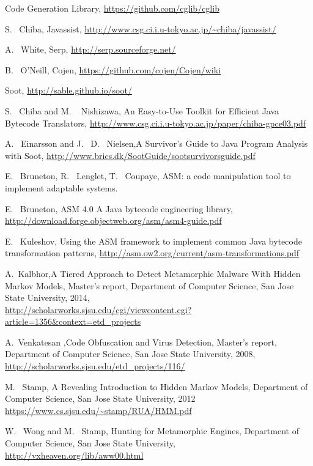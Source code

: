 \begin{thebibliography}{10}
 Code Generation Library,
\url{https://github.com/cglib/cglib}

 S. ~Chiba, Javassist,
\url{http://www.csg.ci.i.u-tokyo.ac.jp/~chiba/javassist/}

 A. ~White, Serp,
\url{http://serp.sourceforge.net/}

 B. ~O'Neill, Cojen,
\url{https://github.com/cojen/Cojen/wiki}

 Soot,
\url{http://sable.github.io/soot/}

 S. ~Chiba and M. ~ Nishizawa, An Easy-to-Use Toolkit for Efficient Java
Bytecode Translators,
\url{http://www.csg.ci.i.u-tokyo.ac.jp/paper/chiba-gpce03.pdf}

 A. ~Einarsson and J. ~D. ~Nielsen,A Survivor’s Guide to Java Program Analysis with Soot,
\url{http://www.brics.dk/SootGuide/sootsurvivorsguide.pdf}

 E. ~Bruneton, R. ~Lenglet, T. ~Coupaye, ASM: a code manipulation tool to implement adaptable systems.

 E. ~Bruneton, ASM 4.0 A Java bytecode engineering library,
\url{http://download.forge.objectweb.org/asm/asm4-guide.pdf}

 E. ~Kuleshov, Using the ASM framework to implement common Java bytecode transformation patterns,
\url{http://asm.ow2.org/current/asm-transformations.pdf}

 A.~Kalbhor,A Tiered Approach to Detect Metamorphic Malware With Hidden Markov Models,
Master's report, Department of Computer Science, San Jose State University, 2014,\\
\url{http://scholarworks.sjsu.edu/cgi/viewcontent.cgi?article=1356&context=etd_projects}

 A.~Venkatesan ,Code Obfuscation and Virus Detection,
Master's report, Department of Computer Science, San Jose State University, 2008,\\
\url{http://scholarworks.sjsu.edu/etd_projects/116/}

 M. ~Stamp, A Revealing Introduction to Hidden Markov Models, Department of Computer Science, San Jose State University, 2012
\url{https://www.cs.sjsu.edu/~stamp/RUA/HMM.pdf}

 W. ~Wong and M. ~Stamp, Hunting for Metamorphic Engines, Department of Computer Science, San Jose State University,
\url{http://vxheaven.org/lib/aww00.html}


\end{thebibliography}

